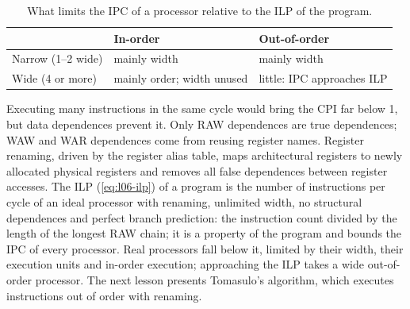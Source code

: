 \documentclass[../main.tex]{subfiles}
\begin{document}
\begin{table}[htbp]
  \centering\small
  \caption{What limits the IPC of a processor relative to the ILP of the
    program.}
  \label{tab:l06-limits}
  \begin{tabular}{@{}lll@{}}
    \toprule
    & In-order & Out-of-order \\
    \midrule
    Narrow (1--2 wide) & mainly width & mainly width \\
    Wide (4 or more)   & mainly order; width unused & little: IPC approaches ILP \\
    \bottomrule
  \end{tabular}
\end{table}

\begin{keypoint}
  Executing many instructions in the same cycle would bring the CPI far below
  1, but data dependences prevent it.  Only RAW dependences are true
  dependences; WAW and WAR dependences come from reusing register names.
  Register renaming, driven by the register alias table, maps architectural
  registers to newly allocated physical registers and removes all false
  dependences between register accesses.  The ILP (\cref{eq:l06-ilp}) of a
  program is the number of instructions per cycle of an ideal processor with
  renaming, unlimited width, no structural dependences and perfect branch
  prediction: the instruction count divided by the
  length of the longest RAW chain; it is a property of the program and bounds
  the IPC of every processor.  Real processors fall below it, limited by
  their width, their execution units and in-order execution; approaching the ILP takes a wide
  out-of-order processor.
  The next lesson presents Tomasulo's
  algorithm, which executes instructions out of order with renaming.
\end{keypoint}
\end{document}
